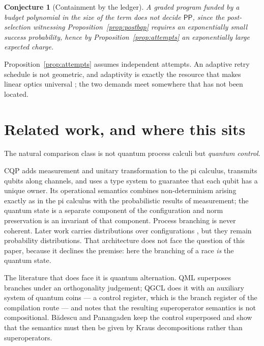 \documentclass[11pt,a4paper]{article}
\theoremstyle{plain}
\newtheorem{conjecture}[theorem]{Conjecture}
\theoremstyle{definition}
\theoremstyle{remark}
\begin{document}
\begin{conjecture}[Containment by the ledger]\label{conj:ledger}
A graded program funded by a budget polynomial in the size of the term does not
decide $\mathsf{PP}$, since the post-selection witnessing
Proposition~\ref{prop:postbqp} requires an exponentially small success
probability, hence by Proposition~\ref{prop:attempts} an exponentially large
expected charge.
\end{conjecture}

Proposition~\ref{prop:attempts} assumes independent attempts. An adaptive retry
schedule is not geometric, and adaptivity is exactly the resource that makes
linear optics universal \cite{KLM}; the two demands meet somewhere that has not
been located.

\section{Related work, and where this sits}\label{sec:related}

The natural comparison class is not quantum process calculi but \emph{quantum
control}.

CQP \cite{GayNagarajanCQP,GayNagarajanTypes} adds measurement and unitary
transformation to the pi calculus, transmits qubits along channels, and uses a
type system to guarantee that each qubit has a unique owner. Its operational
semantics combines non-determinism arising exactly as in the pi calculus with
the probabilistic results of measurement; the quantum state is a separate
component of the configuration and norm preservation is an invariant of that
component. Process branching is never coherent. Later work carries distributions
over configurations \cite{QuantumBarbs}, but they remain probability
distributions. That architecture does not face the question of this paper,
because it declines the premise: here the branching of a race \emph{is} the
quantum state.

The literature that does face it is quantum alternation. QML
\cite{AltenkirchGrattage} superposes branches under an orthogonality judgement;
QGCL \cite{YingYuFeng} does it with an auxiliary system of quantum coins ---
a control register, which is the branch register of the compilation route ---
and notes that the resulting superoperator semantics is not compositional.
Bădescu and Panangaden \cite{BadescuPanangaden} keep the control superposed and
show that the semantics must then be given by Kraus decompositions rather than
superoperators.
\end{document}
